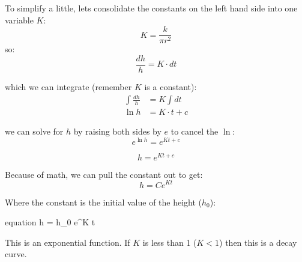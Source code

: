\documentclass[11pt,fleqn]{article}
\begin{document}
	To simplify a little, lets consolidate the constants on the left hand side into one variable $K$:
	\begin{equation}
		K = \frac{k}{\pi r^2 }
	\end{equation}
	so:
	\begin{equation}
		\frac{dh}{h} = K \cdot dt 
	\end{equation}
	
	which we can integrate (remember $K$ is a constant):
	\begin{align}
		\int \frac{dh}{h} &= K \int dt \\
		\ln{h} &= K \cdot t + c
	\end{align}
	
	we can solve for $h$ by raising both sides by $e$ to cancel the $\ln$:
	\begin{equation}
		e^{\ln{h}} = e^{K t + c}
	\end{equation}

	\begin{equation}
		h = e^{K t + c}
	\end{equation}

	Because of math, we can pull the constant out to get:
	\begin{equation}
		h = Ce^{K t}
	\end{equation}

	Where the constant is the initial value of the height ($h_0$):
	\begin{empheq}[]{equation}
		\label{analyticalDraining}
		h = h_0 \cdot e^{K t}
	\end{empheq}

	This is an exponential function. If $K$ is less than 1 ($K<1$) then this is a decay curve.
	
	

 
\end{document}
